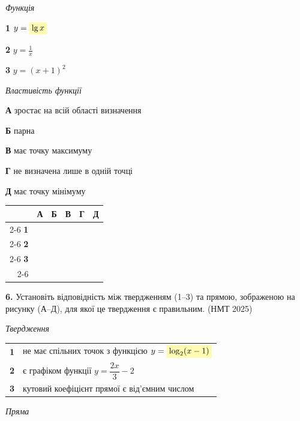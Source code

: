 \documentclass[14pt]{extarticle}
\newcommand{\answerGridSmall}{
    \begingroup
    \renewcommand{\arraystretch}{1.2} 
    \setlength{\tabcolsep}{5pt} 
    \begin{tabular}{r|c|c|c|c|c|}
         \multicolumn{1}{c}{} & \multicolumn{1}{c}{\textbf{А}} & \multicolumn{1}{c}{\textbf{Б}} & \multicolumn{1}{c}{\textbf{В}} & \multicolumn{1}{c}{\textbf{Г}} & \multicolumn{1}{c}{\textbf{Д}} \\ \cline{2-6}
         \textbf{1} & & & & & \\ \cline{2-6}
         \textbf{2} & & & & & \\ \cline{2-6}
         \textbf{3} & & & & & \\ \cline{2-6}
    \end{tabular}
    \endgroup
}
\newcommand{\matchingLayoutBottom}[2]{
    \noindent
    \begin{minipage}[t]{0.48\textwidth}
        #1
    \end{minipage}%
    \hfill
    \begin{minipage}[t]{0.48\textwidth}
        #2
    \end{minipage}
    
    \vspace{0.5cm}
    
    \noindent
    \answerGridSmall
}
\newcommand{\nmtyear}[1]{\hfill{\small\color{yearcolor}(НМТ #1)}}
\begin{document}
\matchingLayoutBottom{\textit{Функція}

\textbf{1} \quad $y = \colorbox{yellow!30}{$\lg x$}$

\textbf{2} \quad $y = \displaystyle\frac{1}{x}$

\textbf{3} \quad $y = (x + 1)^2$
}{
\textit{Властивість функції}

\textbf{А} \quad зростає на всій області визначення

\textbf{Б} \quad парна

\textbf{В} \quad має точку максимуму

\textbf{Г} \quad не визначена лише в одній точці

\textbf{Д} \quad має точку мінімуму
}


\vspace{1cm}

\noindent\textbf{6.} Установіть відповідність між твердженням (1--3) та прямою, зображеною на рисунку (А--Д), для якої це твердження є правильним. \nmtyear{2025}
\vspace{0.3cm}

\textit{Твердження} \par \vspace{0.2cm}
\begin{tabular}{@{}p{0.4cm} p{14cm}@{}}
\textbf{1} & не має спільних точок з функцією $y = \colorbox{yellow!30}{$\log_2(x-1)$}$ \\[0.4cm]
\textbf{2} & є графіком функції $y=\dfrac{2x}{3}-2$ \\[0.4cm]
\textbf{3} & кутовий коефіцієнт прямої є від'ємним числом \\
\end{tabular}

\vspace{0.5cm}

\textit{Пряма} \par \vspace{0.2cm}
\end{document}

